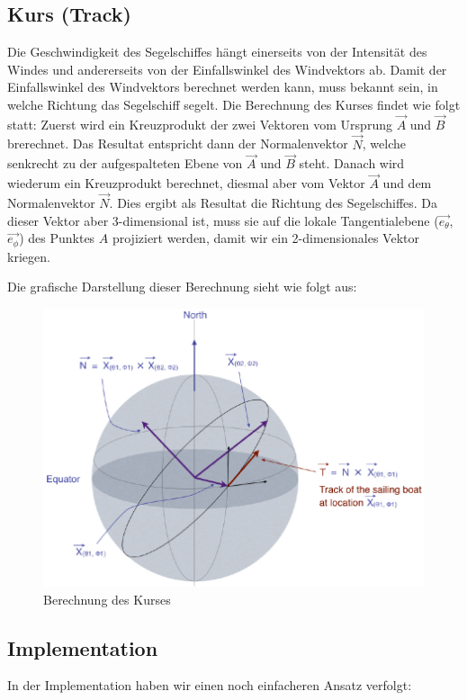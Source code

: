 \subsection{Kurs (Track)}
Die Geschwindigkeit des Segelschiffes hängt einerseits von der Intensität des
Windes und andererseits von der Einfallswinkel des Windvektors ab. Damit der
Einfallswinkel des Windvektors berechnet werden kann, muss bekannt sein, in
welche Richtung das Segelschiff segelt. Die Berechnung des Kurses findet wie
folgt statt: Zuerst wird ein Kreuzprodukt der zwei Vektoren vom Ursprung
\(\overrightarrow{A}\) und \(\overrightarrow{B}\) brerechnet. Das Resultat
entspricht dann der Normalenvektor \(\overrightarrow{N}\), welche senkrecht zu
der aufgespalteten Ebene von \(\overrightarrow{A}\) und \(\overrightarrow{B}\)
steht. Danach wird wiederum ein Kreuzprodukt berechnet, diesmal aber vom
Vektor \(\overrightarrow{A}\) und dem Normalenvektor \(\overrightarrow{N}\).
Dies ergibt als Resultat die Richtung des Segelschiffes. Da dieser Vektor aber
3-dimensional ist, muss sie auf die lokale Tangentialebene
(\(\overrightarrow{e_{\theta}}\), \(\overrightarrow{e_{\phi}}\)) des Punktes
$A$ projiziert werden, damit wir ein 2-dimensionales Vektor kriegen.

Die grafische Darstellung dieser Berechnung sieht wie folgt aus:
\begin{figure}[h!]
\centering
\includegraphics[width=0.8\linewidth]{img/track}
\caption{Berechnung des Kurses}
\label{gridnetConn}
\end{figure}

\subsection{Implementation}
\label{implSegelgeschwindigkeit}
In der Implementation haben wir einen noch einfacheren Ansatz verfolgt:

